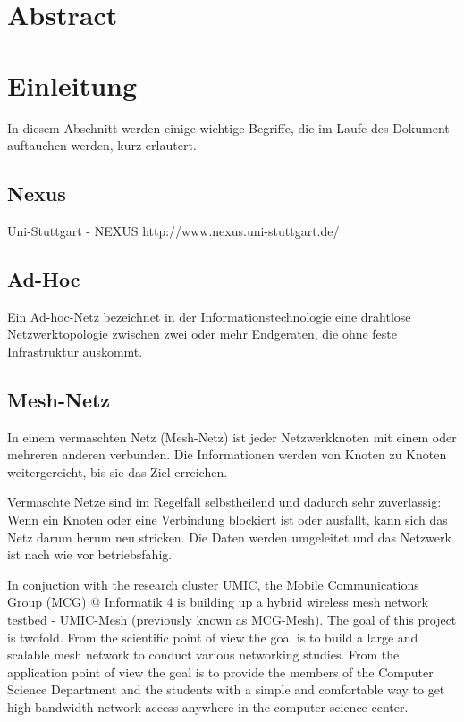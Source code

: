 \section{Abstract}


\section{Einleitung}

In diesem Abschnitt werden einige wichtige Begriffe, die im Laufe des Dokument auftauchen werden, kurz erlautert. 

\subsection{Nexus}

Uni-Stuttgart - NEXUS 
 http://www.nexus.uni-stuttgart.de/
 
\subsection{Ad-Hoc}

Ein Ad-hoc-Netz bezeichnet in der Informationstechnologie eine drahtlose Netzwerktopologie zwischen zwei oder mehr Endgeraten, die ohne feste Infrastruktur auskommt. 


\subsection{Mesh-Netz}

In einem vermaschten Netz (Mesh-Netz) ist jeder Netzwerkknoten mit einem oder mehreren anderen verbunden. Die Informationen werden von Knoten zu Knoten weitergereicht, bis sie das Ziel erreichen. 

Vermaschte Netze sind im Regelfall selbstheilend und dadurch sehr zuverlassig: Wenn ein Knoten oder eine Verbindung blockiert ist oder ausfallt, kann sich das Netz darum herum neu stricken. Die Daten werden umgeleitet und das Netzwerk ist nach wie vor betriebsfahig. 

In conjuction with the research cluster UMIC, the Mobile Communications Group (MCG) @ Informatik 4 is building up a hybrid wireless mesh network testbed - UMIC-Mesh (previously known as MCG-Mesh). The goal of this project is twofold. From the scientific point of view the goal is to build a large and scalable mesh network to conduct various networking studies. From the application point of view the goal is to provide the members of the Computer Science Department and the students with a simple and comfortable way to get high bandwidth network access anywhere in the computer science center. 

